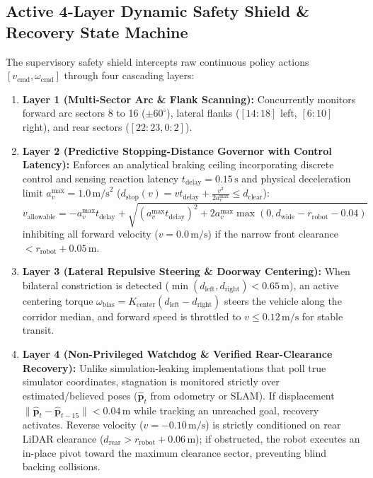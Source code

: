 \documentclass[runningheads]{llncs}
\begin{document}
\subsection{Active 4-Layer Dynamic Safety Shield \& Recovery State Machine}
The supervisory safety shield intercepts raw continuous policy actions $[v_{\text{cmd}}, \omega_{\text{cmd}}]$ through four cascading layers:
\begin{enumerate}
    \item \textbf{Layer 1 (Multi-Sector Arc \& Flank Scanning):} Concurrently monitors forward arc sectors 8 to 16 ($\pm 60^\circ$), lateral flanks ($[14:18]$ left, $[6:10]$ right), and rear sectors ($[22:23, 0:2]$).
    \item \textbf{Layer 2 (Predictive Stopping-Distance Governor with Control Latency):} Enforces an analytical braking ceiling incorporating discrete control and sensing reaction latency $t_{\text{delay}} = 0.15\,\text{s}$ and physical deceleration limit $a_v^{\max} = 1.0\,\text{m/s}^2$ ($d_{\text{stop}}(v) = v t_{\text{delay}} + \frac{v^2}{2 a_v^{\max}} \le d_{\text{clear}}$):
    \begin{equation}
    v_{\text{allowable}} = -a_v^{\max} t_{\text{delay}} + \sqrt{(a_v^{\max} t_{\text{delay}})^2 + 2 a_v^{\max} \max(0, d_{\text{wide}} - r_{\text{robot}} - 0.04)}
    \end{equation}
    inhibiting all forward velocity ($v = 0.0\,\text{m/s}$) if the narrow front clearance $< r_{\text{robot}} + 0.05\,\text{m}$.
    \item \textbf{Layer 3 (Lateral Repulsive Steering \& Doorway Centering):} When bilateral constriction is detected ($\min(d_{\text{left}}, d_{\text{right}}) < 0.65\,\text{m}$), an active centering torque $\omega_{\text{bias}} = K_{\text{center}} (d_{\text{left}} - d_{\text{right}})$ steers the vehicle along the corridor median, and forward speed is throttled to $v \le 0.12\,\text{m/s}$ for stable transit.
    \item \textbf{Layer 4 (Non-Privileged Watchdog \& Verified Rear-Clearance Recovery):} Unlike simulation-leaking implementations that poll true simulator coordinates, stagnation is monitored strictly over estimated/believed poses ($\hat{\mathbf{p}}_t$ from odometry or SLAM). If displacement $\|\hat{\mathbf{p}}_t - \hat{\mathbf{p}}_{t-15}\| < 0.04\,\text{m}$ while tracking an unreached goal, recovery activates. Reverse velocity ($v = -0.10\,\text{m/s}$) is strictly conditioned on rear LiDAR clearance ($d_{\text{rear}} > r_{\text{robot}} + 0.06\,\text{m}$); if obstructed, the robot executes an in-place pivot toward the maximum clearance sector, preventing blind backing collisions.
\end{enumerate}
\end{document}
